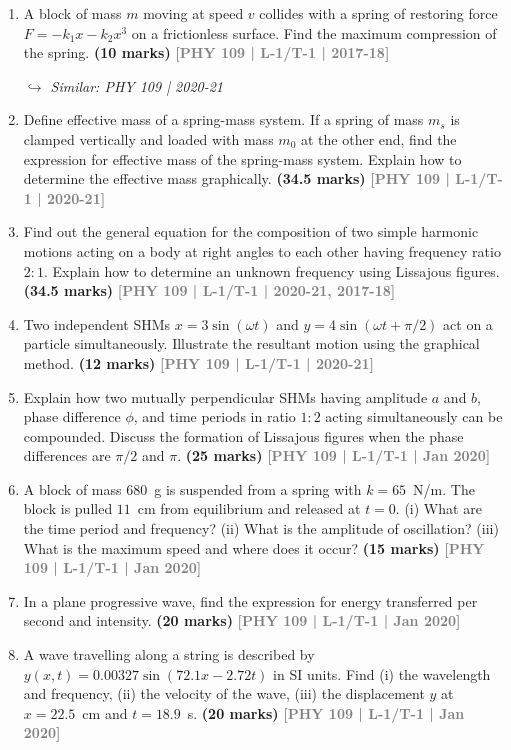 \documentclass[12pt,a3paper]{article}
\newcommand{\yr}[1]{\hfill\textcolor{gray}{\small\textbf{[#1]}}}
\newcommand{\mk}[1]{\textcolor{orange!70!black}{\small\textbf{(#1 marks)}}}
\newcommand{\variant}[1]{\par\vspace{1pt}\textcolor{blue!50!black}%
  {\footnotesize\textit{$\hookrightarrow$ Similar: #1}}}
\begin{document}
\begin{enumerate}
  
\item A block of mass $m$ moving at speed $v$ collides with a spring of restoring force $F = -k_1 x - k_2 x^3$ on a frictionless surface. Find the maximum compression of the spring.
\mk{10} \yr{PHY 109 | L-1/T-1 | 2017-18}
\variant{PHY 109 | 2020-21}

\item Define effective mass of a spring-mass system. If a spring of mass $m_s$ is clamped vertically and loaded with mass $m_0$ at the other end, find the expression for effective mass of the spring-mass system. Explain how to determine the effective mass graphically.
\mk{34.5} \yr{PHY 109 | L-1/T-1 | 2020-21}

\item Find out the general equation for the composition of two simple harmonic motions acting on a body at right angles to each other having frequency ratio $2:1$. Explain how to determine an unknown frequency using Lissajous figures.
\mk{34.5} \yr{PHY 109 | L-1/T-1 | 2020-21, 2017-18}

\item Two independent SHMs $x = 3\sin(\omega t)$ and $y = 4\sin(\omega t + \pi/2)$ act on a particle simultaneously. Illustrate the resultant motion using the graphical method.
\mk{12} \yr{PHY 109 | L-1/T-1 | 2020-21}

\item Explain how two mutually perpendicular SHMs having amplitude $a$ and $b$, phase difference $\phi$, and time periods in ratio $1:2$ acting simultaneously can be compounded. Discuss the formation of Lissajous figures when the phase differences are $\pi/2$ and $\pi$.
\mk{25} \yr{PHY 109 | L-1/T-1 | Jan 2020}

\item A block of mass $680$~g is suspended from a spring with $k = 65$~N/m. The block is pulled $11$~cm from equilibrium and released at $t = 0$. (i) What are the time period and frequency? (ii) What is the amplitude of oscillation? (iii) What is the maximum speed and where does it occur?
\mk{15} \yr{PHY 109 | L-1/T-1 | Jan 2020}

\item In a plane progressive wave, find the expression for energy transferred per second and intensity.
\mk{20} \yr{PHY 109 | L-1/T-1 | Jan 2020}

\item A wave travelling along a string is described by $y(x,t) = 0.00327\sin(72.1x - 2.72t)$ in SI units. Find (i) the wavelength and frequency, (ii) the velocity of the wave, (iii) the displacement $y$ at $x = 22.5$~cm and $t = 18.9$~s.
\mk{20} \yr{PHY 109 | L-1/T-1 | Jan 2020}


\end{enumerate}
\end{document}
